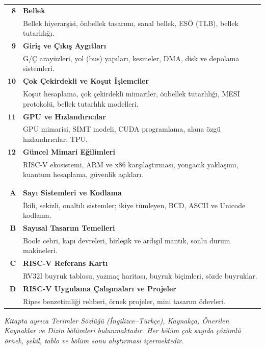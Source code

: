 \documentclass[12pt, a4paper, twoside, openright]{book}
\begin{document}
\begin{longtable}{@{}>{\bfseries\color{bolumrenk}}r@{\hspace{0.5cm}}p{12.8cm}}
8 & \textbf{Bellek}\\
  & {\small Bellek hiyerarşisi, önbellek tasarımı, sanal bellek, ESÖ (TLB), bellek tutarlılığı.}\\[2pt]

9 & \textbf{Giriş ve Çıkış Aygıtları}\\
  & {\small G/Ç arayüzleri, yol (bus) yapıları, kesmeler, DMA, disk ve depolama sistemleri.}\\[2pt]

10 & \textbf{Çok Çekirdekli ve Koşut İşlemciler}\\
  & {\small Koşut hesaplama, çok çekirdekli mimariler, önbellek tutarlılığı, MESI protokolü, bellek tutarlılık modelleri.}\\[2pt]

11 & \textbf{GPU ve Hızlandırıcılar}\\
  & {\small GPU mimarisi, SIMT modeli, CUDA programlama, alana özgü hızlandırıcılar, TPU.}\\[2pt]

12 & \textbf{Güncel Mimari Eğilimleri}\\
  & {\small RISC-V ekosistemi, ARM ve x86 karşılaştırması, yongacık yaklaşımı, kuantum hesaplama, güvenlik açıkları.}\\[6pt]

\multicolumn{2}{@{}l}{\large\bfseries\color{bolumrenk} Ekler}\\[4pt]
\hline\\[-8pt]

A & \textbf{Sayı Sistemleri ve Kodlama}\\
  & {\small İkili, sekizli, onaltılı sistemler; ikiye tümleyen, BCD, ASCII ve Unicode kodlama.}\\[2pt]

B & \textbf{Sayısal Tasarım Temelleri}\\
  & {\small Boole cebri, kapı devreleri, birleşik ve ardışıl mantık, sonlu durum makineleri.}\\[2pt]

C & \textbf{RISC-V Referans Kartı}\\
  & {\small RV32I buyruk tablosu, yazmaç haritası, buyruk biçimleri, sözde buyruklar.}\\[2pt]

D & \textbf{RISC-V Uygulama Çalışmaları ve Projeler}\\
  & {\small Ripes benzetimliği rehberi, örnek projeler, mini tasarım ödevleri.}\\[2pt]

\end{longtable}
\renewcommand{\arraystretch}{1.0}

\vspace{0.8cm}
\noindent
{\small\itshape Kitapta ayrıca Terimler Sözlüğü (İngilizce--Türkçe), Kaynakça, Önerilen Kaynaklar ve Dizin bölümleri bulunmaktadır. Her bölüm çok sayıda çözümlü örnek, şekil, tablo ve bölüm sonu alıştırması içermektedir.}

\cleardoublepage

\mainmatter


\backmatter

\end{document}
